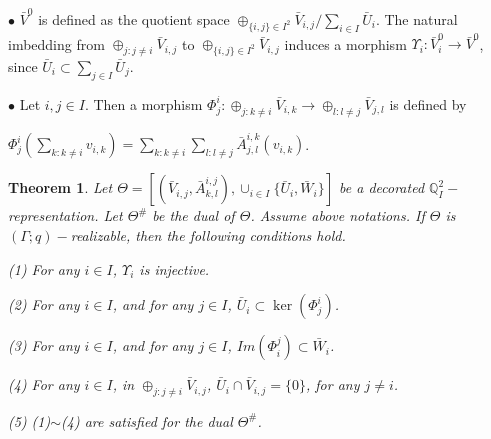 \def\CTEXPreproc{Created by ctex v0.2.12, don't edit!}\documentclass[11pt]{article}
\newtheorem{thm}{Theorem}[section]
\begin{document}
\noindent $\bullet$ $\bar{V}^0 $ is defined as the quotient space $\oplus _{\{ i,j\} \in I^2 } \bar{V}_{i,j} / \sum_{i\in I } \bar{U}_i   $.  The natural imbedding from  $ \oplus_{j: j\neq i} \bar{V}_{i,j} $ to $\oplus _{\{ i,j\} \in I^2 } \bar{V}_{i,j}$ induces a morphism
$ \Upsilon_i : \bar{V}^0 _i \rightarrow \bar{V}^0$, since $ \bar{U}_i  \subset \sum_{j\in I } \bar{U}_j  $.

\noindent $\bullet$ Let $i,j\in I$. Then a morphism  $ \Phi^i _j : \oplus_{j: k\neq i} \bar{V}_{i,k} \rightarrow  \oplus_{l: l\neq j} \bar{V}_{j,l} $ is defined by

$\Phi^i _j (  \sum_{k:k\neq i} v_{i,k}  ) =   \sum_{ k: k\neq i  } \sum _{l: l\neq j } \bar{A}^{i,k} _{j,l} (v_{i,k})   $.

  \begin{thm}
  Let $\Theta = [ ( \bar{V}_{i,j} , \bar{A}^{i,j}_{k,l} ) ,  \cup_{i\in I} \{ \bar{U}_i ,\bar{W}_i \}    ] $ be a decorated $\mathbb{Q}^2 _I -$representation. Let $\Theta^{\#}$ be the dual of $\Theta$.  Assume above notations.  If $\Theta$ is $( \Gamma;q) -$realizable, then the following conditions hold.

 \noindent (1)  For any $i\in I$, $\Upsilon_i $ is injective.

 \noindent (2)  For any $i\in I$, and for any $j\in I$,  $\bar{U}_i  \subset \ker( \Phi^i _j  ) $.

 \noindent (3)  For any $i\in I$, and for any $j\in I$, $Im ( \Phi^j _i   )\subset \bar{W}_i   $.

  \noindent (4) For any $i\in I$, in $ \oplus_{j: j\neq i} \bar{V}_{i,j} $,   $  \bar{U}_i \cap  \bar{V}_{i,j} = \{ 0\} $, for any $j\neq i$.

 \noindent (5)  (1)$\sim$(4) are satisfied for the dual $\Theta^{\#}$.

  \end{thm}
\end{document}

